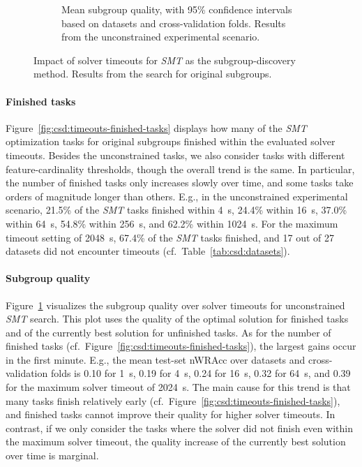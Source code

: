 \documentclass{article}
\theoremstyle{definition}
\begin{document}
\begin{figure}[t]
\begin{subfigure}[t]{0.48\textwidth}
		\caption{
			Mean subgroup quality, with 95\% confidence intervals based on datasets and cross-validation folds.
			Results from the unconstrained experimental scenario.
		}
		\label{fig:csd:timeouts-nwracc}
	\end{subfigure}
	\caption{
		Impact of solver timeouts for \emph{SMT} as the subgroup-discovery method.
		Results from the search for original subgroups.
	}
	\label{fig:csd:timeouts}
\end{figure}

\paragraph{Finished tasks}

Figure~\ref{fig:csd:timeouts-finished-tasks} displays how many of the \emph{SMT} optimization tasks for original subgroups finished within the evaluated solver timeouts.
Besides the unconstrained tasks, we also consider tasks with different feature-cardinality thresholds, though the overall trend is the same.
In particular, the number of finished tasks only increases slowly over time, and some tasks take orders of magnitude longer than others.
E.g., in the unconstrained experimental scenario, 21.5\% of the \emph{SMT} tasks finished within 4~s, 24.4\% within 16~s, 37.0\% within 64~s, 54.8\% within 256~s, and 62.2\% within 1024~s.
For the maximum timeout setting of 2048~s, 67.4\% of the \emph{SMT} tasks finished, and 17 out of 27 datasets did not encounter timeouts (cf.~Table~\ref{tab:csd:datasets}).

\paragraph{Subgroup quality}

Figure~\ref{fig:csd:timeouts-nwracc} visualizes the subgroup quality over solver timeouts for unconstrained \emph{SMT} search.
This plot uses the quality of the optimal solution for finished tasks and of the currently best solution for unfinished tasks.
As for the number of finished tasks (cf.~Figure~\ref{fig:csd:timeouts-finished-tasks}), the largest gains occur in the first minute.
E.g., the mean test-set nWRAcc over datasets and cross-validation folds is 0.10 for 1~s, 0.19 for 4~s, 0.24 for 16~s, 0.32 for 64~s, and 0.39 for the maximum solver timeout of 2024~s.
The main cause for this trend is that many tasks finish relatively early (cf.~Figure~\ref{fig:csd:timeouts-finished-tasks}), and finished tasks cannot improve their quality for higher solver timeouts.
In contrast, if we only consider the tasks where the solver did not finish even within the maximum solver timeout, the quality increase of the currently best solution over time is marginal.
\end{document}
